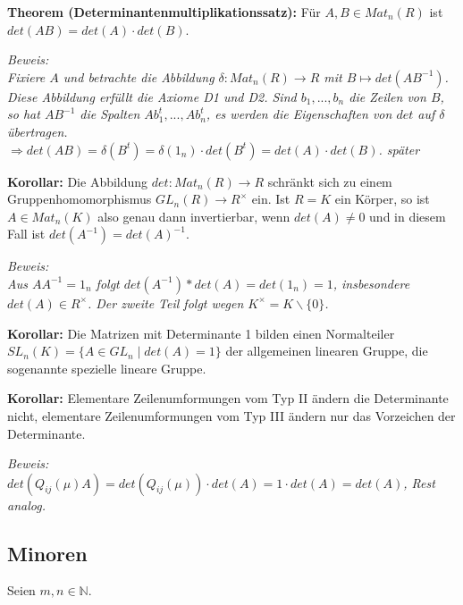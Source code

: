 \documentclass[11pt]{article}
\begin{document}
		\begin{mdframed}[backgroundcolor=blue!20]
			\textbf{Theorem (Determinantenmultiplikationssatz):} Für $A,B\in Mat_n(R)$ ist $det(AB)=det(A)\cdot det(B)$.
		\end{mdframed}
		\textit{Beweis: \\
		Fixiere $A$ und betrachte die Abbildung $\delta: Mat_n(R)\to R$ mit $B\mapsto det(AB^{-1})$. Diese Abbildung erfüllt die Axiome 
		D1 und D2. Sind $b_1,...,b_n$ die Zeilen von $B$, so hat $AB^{-1}$ die Spalten $Ab_1^t,...,Ab_n^t$, es werden die Eigenschaften 
		von $det$ auf $\delta$ übertragen. \\
		$\Rightarrow det(AB)=\delta(B^t)=\delta(1_n)\cdot det(B^t)=det(A)\cdot det(B)$.
		später}
		
		\begin{framed}
			\textbf{Korollar:} Die Abbildung $det:Mat_n(R)\to R$ schränkt sich zu einem Gruppenhomomorphismus $GL_n(R)\to 
			R^{\times}$ ein. Ist $R=K$ ein Körper, so ist $A\in Mat_n(K)$ also genau dann invertierbar, wenn $det(A)\neq 0$ und in 
			diesem Fall ist $det(A^{-1})=det(A)^{-1}$.
		\end{framed}
		\textit{Beweis: \\
		Aus $AA^{-1}=1_n$ folgt $det(A^{-1})*det(A)=det(1_n)=1$, insbesondere $det(A)\in R^{\times}$. Der zweite Teil folgt wegen 
		$K^{\times}=K\backslash \{0\}$.}
		
		\begin{framed}
			\textbf{Korollar:} Die Matrizen mit Determinante 1 bilden einen Normalteiler $SL_n(K)=\{A\in GL_n \mid det(A)=1\}$ der 
			allgemeinen linearen Gruppe, die sogenannte spezielle lineare Gruppe.
		\end{framed}
		
		\begin{framed}
			\textbf{Korollar:} Elementare Zeilenumformungen vom Typ II ändern die Determinante nicht, elementare Zeilenumformungen vom 
			Typ III ändern nur das Vorzeichen der Determinante.
		\end{framed}
		\textit{Beweis: \\
		$det(Q_{ij}(\mu)A)=det(Q_{ij}(\mu)) \cdot det(A)= 1\cdot det(A) = det(A)$, Rest analog.}
		
	\subsection{Minoren}
		Seien $m,n\in \mathbb N$.
		
\end{document}
